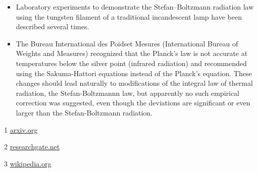 \begin{itemize}

    \item Laboratory experiments to demonstrate the Stefan–Boltzmann radiation law using the tungsten filament of a traditional incandescent lamp have been described several times.~\cite{Marcello}

    \item The Bureau International des Poidset Mesures (International Bureau of Weights and Measures) recognized that the Planck’s law is not accurate at temperatures below the silver point (infrared radiation) and recommended using the Sakuma-Hattori equations instead of the Planck’s equation. These changes should lead naturally to modifications of the integral law of thermal radiation, the Stefan-Boltzmannn law, but apparently no such empirical correction was suggested, even though the deviations are significant or even larger than the Stefan-Boltzmann radiation.~\cite{Yuri}

\end{itemize}


%
%

1 \href{https://arxiv.org/pdf/1612.03199.pdf}{arxiv.org}

2 \href{https://www.researchgate.net/publication/258757261_Stefan-Boltzmann_law_for_the_tungsten_filament_of_a_light_bulb_Revisiting_the_experiment/link/5954d3ea0f7e9b2da1b3b8ab/download}{researchgate.net}

3 \href{https://en.wikipedia.org/wiki/Stefan%E2%80%93Boltzmann_law}{wikipedia.org}

%
                   
